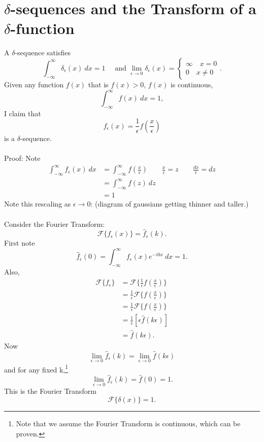 \documentclass[cm]{article}
\renewcommand{\F}{\mathscr F}
\newcommand{\fhat}{\hat{f}}
\renewcommand{\infint}{\int_{-\infty}^{\infty}}
\begin{document}
\section{$\delta$-sequences and the Transform of a $\delta$-function}
A $\delta$-sequence satisfies
$$\infint \delta_{\epsilon}(x)~dx = 1 \quad \text{ and } \lim_{\epsilon \to 0}
\delta_\epsilon(x) = \begin{cases} \infty \quad x = 0 \\ 0 \quad x \neq 0
    \end{cases}.$$
Given any function $f(x)$ that is $f(x) > 0$, $f(x)$ is continuous,
      $$\infint f(x) ~dx = 1,$$
I claim that
$$f_{\epsilon}(x) = \frac{1}{\epsilon}f(\frac{x}{\epsilon})$$
is a $\delta$-sequence.\\~\\
Proof: Note
\begin{align*}
\infint f_{\epsilon}(x)~dx &= \infint f(\frac{x}{\epsilon}) \qquad
    \frac{x}{\epsilon} = z  \qquad \frac{dx}{\epsilon} = dz\\
 &= \infint f(z)~dz \\
 &= 1
\end{align*}
Note this rescaling as $\epsilon \to 0$: (diagram of gaussians getting thinner
and taller.)\\~\\
Consider the Fourier Transform:
$$\F\{f_{\epsilon}(x)\} = \fhat_{\epsilon}(k).$$
First note
$$\fhat_{\epsilon}(0) = \infint f_{\epsilon}(x)e^{-i0x}~dx = 1.$$
Also,
\begin{align*}
\F \{f_{\epsilon}\} &= \F \{ \frac{1}{\epsilon} f\left(\frac{x}{\epsilon}\right)\} \\
    &= \frac{1}{\epsilon} \F\{f\left(\frac{x}{\epsilon}\right)\} \\
    &= \frac{1}{\epsilon} \F\{f\left(\frac{x}{\epsilon}\right)\} \\
    &= \frac{1}{\epsilon} [ \epsilon \fhat(k \epsilon)] \\
    &= \fhat(k \epsilon).
\end{align*}
Now
    $$\lim_{\epsilon \to 0} \fhat_{\epsilon}(k) = \lim_{\epsilon \to 0}
\fhat(k\epsilon)$$
    and for any fixed k,\footnote{Note that we assume the Fourier Transform is
        continuous, which can be proven.}
    $$ \lim_{\epsilon \to 0} \fhat_\epsilon(k) = \fhat(0) = 1.$$
        This is the Fourier Transform
    $$\F\{\delta(x)\} = 1.$$
\end{document}
